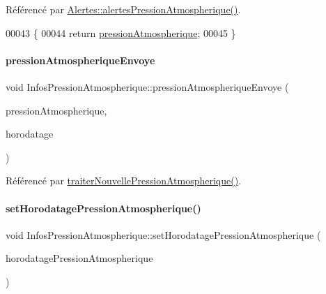 Référencé par \hyperlink{class_alertes_ab8a33e82cdd4d4e0560c9ba6e10ca8d5}{Alertes\+::alertes\+Pression\+Atmospherique()}.


\begin{DoxyCode}
00043 \{
00044     \textcolor{keywordflow}{return} \hyperlink{class_infos_pression_atmospherique_a69f31dc0d0ef59f8ced23e4663ee1ab8}{pressionAtmospherique};
00045 \}
\end{DoxyCode}
\mbox{\label{class_infos_pression_atmospherique_ad5342b25c87fd5e41a89ad74b5f69c86}} 
\paragraph{\texorpdfstring{pression\+Atmospherique\+Envoye}{pressionAtmospheriqueEnvoye}}
{\footnotesize\ttfamily void Infos\+Pression\+Atmospherique\+::pression\+Atmospherique\+Envoye (\begin{DoxyParamCaption}\item[{double}]{pression\+Atmospherique,  }\item[{Q\+String}]{horodatage }\end{DoxyParamCaption})\hspace{0.3cm}{\ttfamily [signal]}}



Référencé par \hyperlink{class_infos_pression_atmospherique_ab280f47f2a1376222a45fde8638489d2}{traiter\+Nouvelle\+Pression\+Atmospherique()}.

\mbox{\label{class_infos_pression_atmospherique_a5d8ba94db66bb7bcdf5a70dd6f21de23}} 
\paragraph{\texorpdfstring{set\+Horodatage\+Pression\+Atmospherique()}{setHorodatagePressionAtmospherique()}}
{\footnotesize\ttfamily void Infos\+Pression\+Atmospherique\+::set\+Horodatage\+Pression\+Atmospherique (\begin{DoxyParamCaption}\item[{const Q\+String}]{horodatage\+Pression\+Atmospherique }\end{DoxyParamCaption})}


